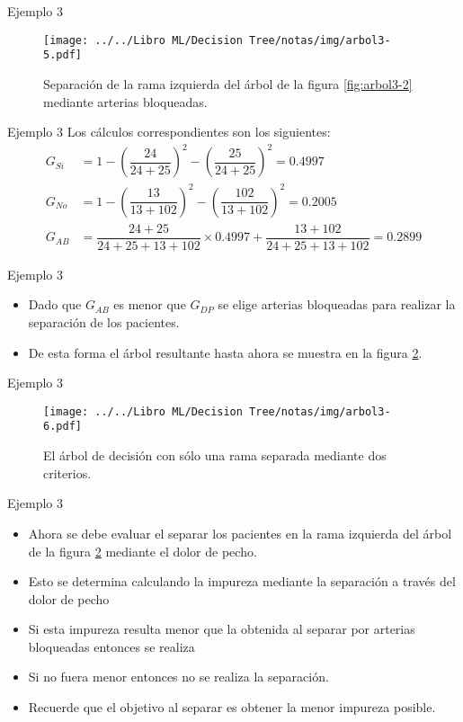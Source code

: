 \documentclass[11pt,aspectratio=169]{beamer}
\begin{document}
\begin{frame}{Ejemplo 3}
	\begin{figure}[H]
		\centering
		\texttt{[image: ../../Libro ML/Decision Tree/notas/img/arbol3-5.pdf]}
		\caption{Separación de la rama izquierda del árbol de la figura \ref{fig:arbol3-2} mediante arterias bloqueadas.}
		\label{fig:arbol3-5}
	\end{figure}
\end{frame}

\begin{frame}{Ejemplo 3}
	Los cálculos correspondientes son los siguientes:\pause
	\begin{align}
		\label{eq:impurezaABSi}
		G_{Si} &= 1 - \left(\dfrac{24}{24+25}\right)^2 - \left(\dfrac{25}{24+25}\right)^2 = 0.4997\\
		\label{eq:impurezaABNo}
		G_{No} &= 1 - \left(\dfrac{13}{13+102}\right)^2 - \left(\dfrac{102}{13+102}\right)^2 = 0.2005\\
		G_{AB} &= \dfrac{24+25}{24+25+13+102}\times 0.4997 + \dfrac{13+102}{24+25+13+102} = 0.2899\nonumber
	\end{align}
\end{frame}

\begin{frame}{Ejemplo 3}
	\begin{itemize}
		\item Dado que $G_{AB}$ es menor que $G_{DP}$ se elige arterias bloqueadas para realizar la 
			separación de los pacientes.\pause
		\item De esta forma el árbol resultante hasta ahora se muestra en la figura \ref{fig:arbol3-6}.
	\end{itemize}
\end{frame}

\begin{frame}{Ejemplo 3}
	\begin{figure}[H]
		\centering
		\texttt{[image: ../../Libro ML/Decision Tree/notas/img/arbol3-6.pdf]}
		\caption{El árbol de decisión con sólo una rama separada mediante dos criterios.}
		\label{fig:arbol3-6}
	\end{figure}
\end{frame}

\begin{frame}{Ejemplo 3}
	\begin{itemize}
		\item Ahora se debe evaluar el separar los pacientes en la rama izquierda del árbol de la figura \ref{fig:arbol3-6} 
			mediante el dolor de pecho.\pause 
		\item Esto se determina calculando la impureza mediante la separación a través del dolor de pecho\pause
		\item Si esta impureza resulta menor que la obtenida al separar por arterias bloqueadas entonces se realiza\pause
		\item Si no fuera menor entonces no se realiza la separación.\pause 
		\item Recuerde que el objetivo al separar es obtener la menor impureza posible.
	\end{itemize}
\end{frame}
\end{document}
